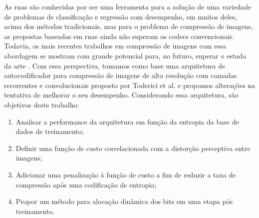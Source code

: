 As \acrshort{rna}s são conhecidas por ser uma ferramenta para a solução de uma variedade de problemas de classificação e regressão com desempenho, em muitos deles, acima dos métodos tradicionais, mas para o problema de compressão de imagens, as propostas baseadas em \acrshort{rna}s ainda não superam os \acrshort{codec}s convencionais. 
Todavia, os mais recentes trabalhos em compressão de imagens com essa abordagem se mostram com grande potencial para, no futuro, superar o estada da arte \cite{FullResolution2017Toderici,Priming2017Johnston,Autoregressive2018Minnen,Variational2018Balle,zhao1901cae,akbari2019dsslic}.     
Com essa perspectiva, tomamos como base uma arquitetura de autocodificador para compressão de imagens de alta resolução com camadas recorrentes e convolucionais proposto por Toderici et al. \cite{FullResolution2017Toderici} e propomos alterações na tentativa de melhorar o seu desempenho. Considerando essa arquitetura, são objetivos deste trabalho:

 \begin{enumerate}
	\item Analisar a performance da arquitetura em função da entropia da base de dados de treinamento;
	\item Definir uma função de custo correlacionada com a distorção perceptiva entre imagens;
	\item Adicionar uma penalização à função de custo a fim de reduzir a taxa de compressão após uma codificação de entropia;
	\item Propor um método para alocação dinâmica dos bits em uma etapa pós treinamento. 
\end{enumerate}






